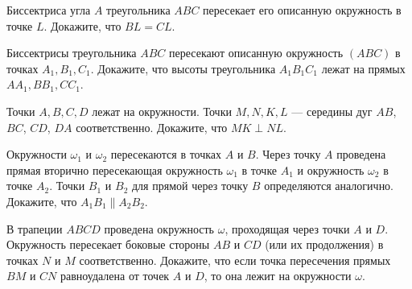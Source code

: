 \begin{tasks}
    \item Биссектриса угла $A$ треугольника $ABC$ пересекает его описанную окружность в точке $L$. Докажите, что $BL = CL$.    %

    \item Биссектрисы треугольника $ABC$ пересекают описанную окружность $(ABC)$ в точках $A_1, B_1, C_1$. Докажите, что высоты треугольника $A_1B_1C_1$ лежат на прямых $AA_1, BB_1, CC_1$. %

    \item Точки $A, B, C, D$ лежат на окружности. Точки $M , N , K, L$ --- середины дуг $AB$, $BC$, $CD$, $DA$ соответственно. Докажите, что $M K \perp N L$.

    \item {}\label{lem:fuss}{Окружности $\omega_1$ и $\omega_2$ пересекаются в точках $A$ и $B$. Через точку $A$ проведена прямая вторично пересекающая окружность $\omega_1$ в точке $A_1$ и окружность $\omega_2$ в точке $A_2$. Точки $B_1$ и $B_2$ для прямой через точку $B$ определяются аналогично. Докажите, что $A_1B_1 \parallel A_2B_2$.}   
    



    \item В трапеции $ABCD$ проведена окружность $\omega$, проходящая через точки $A$ и $D$. Окружность пересекает боковые стороны $AB$ и $CD$ (или их продолжения) в точках $N$ и $M$ соответственно. Докажите, что если точка пересечения прямых $BM$ и $CN$ равноудалена от точек $A$ и $D$, то она лежит на окружности $\omega$. 


\end{tasks}
